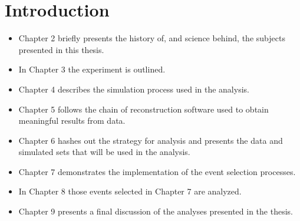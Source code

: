 \chapter{Introduction}
\label{intro_chapter}


\begin{itemize}


\item Chapter 2 briefly presents the history of, and science behind, the
subjects presented in this thesis.

\item In Chapter 3 the experiment is outlined.

\item Chapter 4 describes the simulation process used in the analysis.

\item Chapter 5 follows the chain of reconstruction software used to obtain
meaningful results from data.

\item Chapter 6 hashes out the strategy for analysis and presents the data and
simulated sets that will be used in the analysis.

\item Chapter 7 demonstrates the implementation of the event selection
processes.

\item In Chapter 8 those events selected in Chapter 7 are analyzed.

\item Chapter 9 presents a final discussion of the analyses presented in the
thesis.

\end{itemize}
